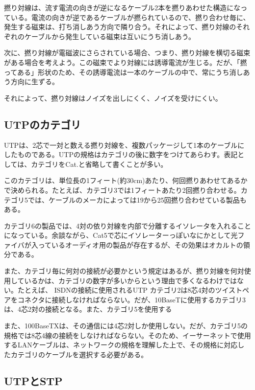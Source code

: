 撚り対線は、流す電流の向きが逆になるケーブル2本を撚りあわせた構造になっている。電流の向きが逆であるケーブルが撚られているので、撚り合わせ毎に、発生する磁束は、打ち消しあう方向で隣り合う。それによって、撚り対線のそれぞれのケーブルから発生している磁束は互いにうち消しあう。

次に、撚り対線が電磁波にさらされている場合、つまり、撚り対線を横切る磁束がある場合を考えよう。この磁束でより対線には誘導電流が生じる。だが、「撚ってある」形状のため、その誘導電流は一本のケーブルの中で、常にうち消しあう方向に生ずる。

それによって、撚り対線はノイズを出しにくく、ノイズを受けにくい。

\subsection{UTPのカテゴリ}

UTPは、2芯で一対と数える撚り対線を、複数パッケージして1本のケーブルにしたものである。UTPの規格はカテゴリの後に数字をつけてあらわす。表記としては、カテゴリをCat.と省略して書くことが多い。

このカテゴリは、単位長の1フィート(約30cm)あたり、何回撚りあわせてあるかで決められる。たとえば、カテゴリ3では1フィートあたり2回撚り合わせる。カテゴリ5では、ケーブルのメーカによっては19から25回撚り合わせている製品もある。

カテゴリ6の製品では、4対の依り対線を内部で分離するイソレータを入れることになっている。余談ながら、Cat5で芯にイソレーターっぽいなにかとして光ファイバが入っているオーディオ用の製品が存在するが、その効果はオカルトの領分である。

また、カテゴリ毎に何対の接続が必要かという規定はあるが、撚り対線を何対使用しているかは、カテゴリの数字が多いからという理由で多くなるわけではない。たとえば、 ISDNの接続に使用されるUTP カテゴリ2は8芯4対のツイストペアをコネクタに接続しなければならない。だが、10BaseTに使用するカテゴリ3は、4芯2対の接続となる。また、カテゴリ5を使用する 

また、100BaseTXは、その通信には4芯2対しか使用しない。だが、カテゴリ5の規格では8芯4線の接続をしなければならない。そのため、イーサーネットで使用するLANケーブルは、ネットワークの規格を理解した上で、その規格に対応したカテゴリのケーブルを選択する必要がある。



\subsection{UTPとSTP}

